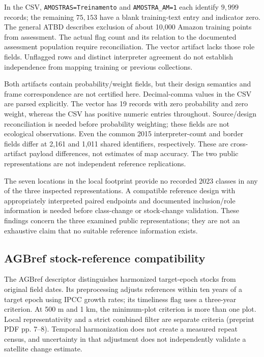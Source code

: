 \documentclass[11pt,a4paper]{article}
\begin{document}
In the CSV, \texttt{AMOSTRAS=Treinamento} and \texttt{AMOSTRA\_AM=1} each identify $9{,}999$ records; the remaining $75{,}153$ have a blank training-text entry and indicator zero. The general ATBD describes exclusion of about 10,000 Amazon training points from assessment. The actual flag count and its relation to the documented assessment population require reconciliation. The vector artifact lacks those role fields. Unflagged rows and distinct interpreter agreement do not establish independence from mapping training or previous collections.

Both artifacts contain probability/weight fields, but their design semantics and frame correspondence are not certified here. Decimal-comma values in the CSV are parsed explicitly. The vector has 19 records with zero probability and zero weight, whereas the CSV has positive numeric entries throughout. Source/design reconciliation is needed before probability weighting; these fields are not ecological observations. Even the common 2015 interpreter-count and border fields differ at 2,161 and 1,011 shared identifiers, respectively. These are cross-artifact payload differences, not estimates of map accuracy. The two public representations are not independent reference replications.

The seven locations in the local footprint provide no recorded 2023 classes in any of the three inspected representations. A compatible reference design with appropriately interpreted paired endpoints and documented inclusion/role information is needed before class-change or stock-change validation. These findings concern the three examined public representations; they are not an exhaustive claim that no suitable reference information exists.

\subsection{AGBref stock-reference compatibility}

The AGBref descriptor distinguishes harmonized target-epoch stocks from original field dates. Its preprocessing adjusts references within ten years of a target epoch using IPCC growth rates; its timeliness flag uses a three-year criterion. At 500 m and 1 km, the minimum-plot criterion is more than one plot. Local representativity and a strict combined filter are separate criteria (preprint PDF pp. 7--8). Temporal harmonization does not create a measured repeat census, and uncertainty in that adjustment does not independently validate a satellite change estimate.
\end{document}
